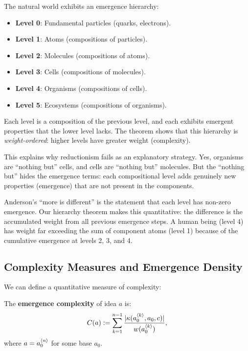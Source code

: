 \begin{interpretation}
The natural world exhibits an emergence hierarchy:
\begin{itemize}
  \item \textbf{Level 0}: Fundamental particles (quarks, electrons).
  \item \textbf{Level 1}: Atoms (compositions of particles).
  \item \textbf{Level 2}: Molecules (compositions of atoms).
  \item \textbf{Level 3}: Cells (compositions of molecules).
  \item \textbf{Level 4}: Organisms (compositions of cells).
  \item \textbf{Level 5}: Ecosystems (compositions of organisms).
\end{itemize}

Each level is a composition of the previous level, and each exhibits emergent
properties that the lower level lacks. The theorem shows that this hierarchy is
\emph{weight-ordered}: higher levels have greater weight (complexity).

This explains why reductionism fails as an explanatory strategy. Yes, organisms
are ``nothing but'' cells, and cells are ``nothing but'' molecules. But the
``nothing but'' hides the emergence terms: each compositional level adds
genuinely new properties (emergence) that are not present in the components.

Anderson's ``more is different'' is the statement that each level has non-zero
emergence. Our hierarchy theorem makes this quantitative: the difference is the
accumulated weight from all previous emergence steps. A human being (level 4)
has weight far exceeding the sum of component atoms (level 1) because of the
cumulative emergence at levels 2, 3, and 4.
\end{interpretation}

\subsection{Complexity Measures and Emergence Density}

We can define a quantitative measure of complexity:

\begin{definition}
\label{def:emergence-complexity}
The \textbf{emergence complexity} of idea $a$ is:
\[
  C(a) := \sum_{k=1}^{n-1} \frac{|\kappa(a_0^{\langle k \rangle}, a_0, c)|}{w(a_0^{\langle k \rangle})},
\]
where $a = a_0^{\langle n \rangle}$ for some base $a_0$.
\end{definition}

